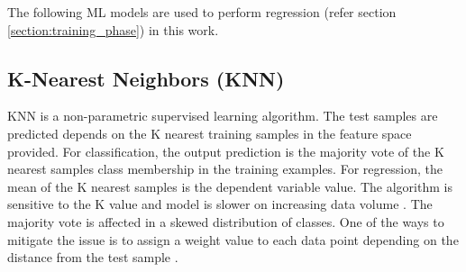 The following ML models are used to perform regression (refer section \ref{section:training_phase}) in this work.






\subsection{K-Nearest Neighbors (KNN)}

KNN is a non-parametric supervised learning algorithm. The test samples are predicted depends on the K nearest training samples in the feature space provided. For classification, the output prediction is the majority vote of the K nearest samples class membership in the training examples. For regression, the mean of the K nearest samples is the dependent variable value. The algorithm is sensitive to the K value and model is slower on increasing data volume \cite{KNN}. The majority vote is affected in a skewed distribution of classes. One of the ways to mitigate the issue is to assign a weight value to each data point depending on the distance from the test sample \cite{scikit-learn}.

